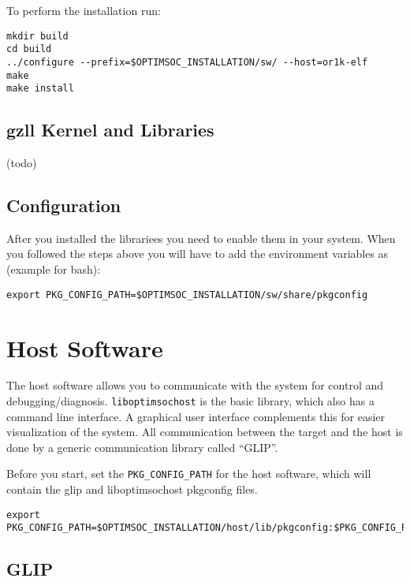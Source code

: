 
To perform the installation run:

\begin{lstlisting}
mkdir build
cd build
../configure --prefix=$OPTIMSOC_INSTALLATION/sw/ --host=or1k-elf
make
make install
\end{lstlisting}

\subsection{gzll Kernel and Libraries}

(todo)

\subsection{Configuration}

After you installed the librariees you need to enable them in your
system. When you followed the steps above you will have to add the
environment variables as (example for bash):

\begin{lstlisting}
export PKG_CONFIG_PATH=$OPTIMSOC_INSTALLATION/sw/share/pkgconfig
\end{lstlisting}

\section{Host Software}

The host software allows you to communicate with the system for
control and debugging/diagnosis. \verb|liboptimsochost| is the basic
library, which also has a command line interface. A graphical user
interface complements this for easier visualization of the system. All
communication between the target and the host is done by a generic communication
library called ``GLIP''.

Before you start, set the \verb|PKG_CONFIG_PATH| for the host software, which
will contain the glip and liboptimsochost pkgconfig files.

\begin{lstlisting}
export PKG_CONFIG_PATH=$OPTIMSOC_INSTALLATION/host/lib/pkgconfig:$PKG_CONFIG_PATH
\end{lstlisting}

\subsection{GLIP}

